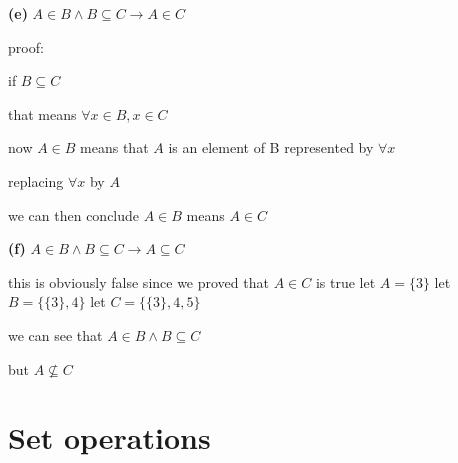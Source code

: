 \documentclass[12pts,A4]{article}
\begin{document}
\begin{flushleft}
   \textbf{(e)} $A \in B \wedge B \subseteq C \rightarrow A \in C$ 
    
    proof: 

    if $B \subseteq C$

    that means $\forall x \in B , x \in C $
    

    now $A \in B$ means that $A$ is an element of B represented by $\forall x$

    replacing $\forall x$ by $A$
    
    we can then conclude $ A \in B$ means $ A \in C$
    
\end{flushleft}

\begin{flushleft}
    \textbf{(f)} $A \in B \wedge B \subseteq C \rightarrow A \subseteq C$ 
    
    this is obviously false since we proved that $A \in C$ is true
    let $ A = \{ 3 \}$
    let $ B = \{ \{ 3 \}, 4 \}$
    let $ C = \{ \{ 3 \}, 4 ,5 \}$



    \bigskip
    we can see that $A \in B \wedge B \subseteq C$

    but $A \not\subseteq C$




\end{flushleft}


\section{Set operations}
\end{document}
